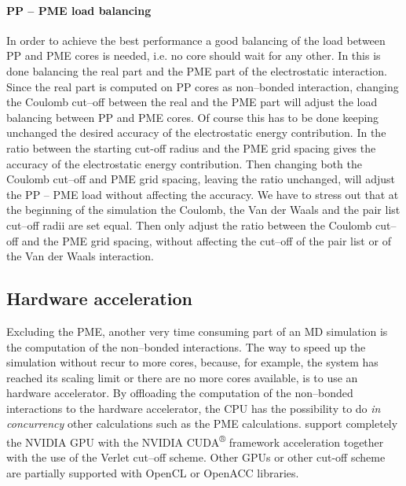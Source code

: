 \paragraph{\textbf{PP -- PME load balancing}} In order to achieve the best performance a good balancing of the 
load between \ac{PP} and \ac{PME} cores is needed, i.e. no core should wait for any other. In \gromacs this is 
done balancing the real part and the \ac{PME} part of the electrostatic interaction. Since the real part is 
computed on \ac{PP} cores as non--bonded interaction, changing the Coulomb cut--off between the real and the 
\ac{PME} part will adjust the load balancing between \ac{PP} and \ac{PME} cores. Of course this has to be done 
keeping unchanged the desired accuracy of the electrostatic energy contribution. In \gromacs the ratio between 
the starting cut-off radius and the \ac{PME} grid spacing gives the accuracy of the electrostatic energy 
contribution. Then changing both the Coulomb cut--off and \ac{PME} grid spacing, leaving the ratio unchanged, 
will adjust the \ac{PP} -- \ac{PME} load without affecting the accuracy. We have to stress out that at the 
beginning of the simulation the Coulomb, the Van der Waals and the pair list cut--off radii are set equal. Then 
\gromacs only adjust the ratio between the Coulomb cut--off and the \ac{PME} grid spacing, without affecting the 
cut--off of the pair list or of the Van der Waals interaction.

\subsection{Hardware acceleration}
Excluding the \ac{PME}, another very time consuming part of an \ac{MD} simulation is the computation of the 
non--bonded interactions. The way to speed up the simulation without recur to more cores, because, for example, 
the system has reached its scaling limit or there are no more cores available, is to use an hardware accelerator. 
By offloading the computation of the non--bonded interactions to the hardware accelerator, the CPU has the 
possibility to do \textit{in concurrency} other calculations such as the \ac{PME} calculations. \gromacs support 
completely the NVIDIA GPU with the NVIDIA CUDA\textsuperscript{®} framework acceleration together with the use of 
the Verlet cut--off scheme. Other GPUs or other cut-off scheme are partially supported with OpenCL or OpenACC 
libraries. 

